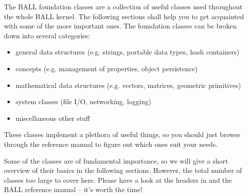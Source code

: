 \label{section:kernel-data-structures}
The BALL foundation classes are a collection of useful classes used throughout
the whole BALL kernel. The following sections shall help you to get acquainted
with some of the more important ones. The foundation classes can be broken down
into several categories:
\begin{itemize}
	\item general data structures (e.g. strings, portable data types, hash
			containers)
	\item concepts (e.g. management of properties, object persistence)
	\item mathematical data structures (e.g. vectors, matrices, geometric
				primitives)
	\item system classes (file I/O, networking, logging)
	\item miscellaneous other stuff
\end{itemize}
These classes implement a plethora of useful things, so you should just browse
through the reference manual to figure out which ones suit your needs. 

Some of the classes are of fundamental importance, so we will give a short overview
of their basics in the following sections. However, the total number of classes
too large to cover here. Please have a look at the headers in 
 and the
BALL reference manual -- it's worth the time!
